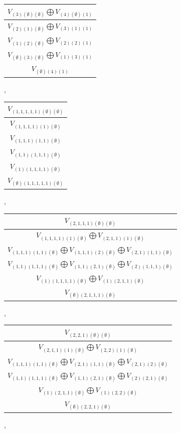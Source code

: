 \documentclass[letterpaper,11pt]{article}
\begin{document}
	\begin{tabular}{| c |}
		\hline
		$V_{(3)(\emptyset)(\emptyset)}$$\bigoplus$$V_{(4)(\emptyset)(1)}$\\
		\hline
		$V_{(2)(1)(\emptyset)}$$\bigoplus$$V_{(3)(1)(1)}$\\
		\hline
		$V_{(1)(2)(\emptyset)}$$\bigoplus$$V_{(2)(2)(1)}$\\
		\hline
		$V_{(\emptyset)(3)(\emptyset)}$$\bigoplus$$V_{(1)(3)(1)}$\\
		\hline
		$V_{(\emptyset)(4)(1)}$\\
		\hline
	\end{tabular}, 
	\begin{tabular}{| c |}
		\hline
		$V_{(1,1,1,1,1)(\emptyset)(\emptyset)}$\\
		\hline
		$V_{(1,1,1,1)(1)(\emptyset)}$\\
		\hline
		$V_{(1,1,1)(1,1)(\emptyset)}$\\
		\hline
		$V_{(1,1)(1,1,1)(\emptyset)}$\\
		\hline
		$V_{(1)(1,1,1,1)(\emptyset)}$\\
		\hline
		$V_{(\emptyset)(1,1,1,1,1)(\emptyset)}$\\
		\hline
	\end{tabular}, 
	\newline 
	\begin{tabular}{| c |}
		\hline
		$V_{(2,1,1,1)(\emptyset)(\emptyset)}$\\
		\hline
		$V_{(1,1,1,1)(1)(\emptyset)}$$\bigoplus$$V_{(2,1,1)(1)(\emptyset)}$\\
		\hline
		$V_{(1,1,1)(1,1)(\emptyset)}$$\bigoplus$$V_{(1,1,1)(2)(\emptyset)}$$\bigoplus$$V_{(2,1)(1,1)(\emptyset)}$\\
		\hline
		$V_{(1,1)(1,1,1)(\emptyset)}$$\bigoplus$$V_{(1,1)(2,1)(\emptyset)}$$\bigoplus$$V_{(2)(1,1,1)(\emptyset)}$\\
		\hline
		$V_{(1)(1,1,1,1)(\emptyset)}$$\bigoplus$$V_{(1)(2,1,1)(\emptyset)}$\\
		\hline
		$V_{(\emptyset)(2,1,1,1)(\emptyset)}$\\
		\hline
	\end{tabular}, 
	\begin{tabular}{| c |}
		\hline
		$V_{(2,2,1)(\emptyset)(\emptyset)}$\\
		\hline
		$V_{(2,1,1)(1)(\emptyset)}$$\bigoplus$$V_{(2,2)(1)(\emptyset)}$\\
		\hline
		$V_{(1,1,1)(1,1)(\emptyset)}$$\bigoplus$$V_{(2,1)(1,1)(\emptyset)}$$\bigoplus$$V_{(2,1)(2)(\emptyset)}$\\
		\hline
		$V_{(1,1)(1,1,1)(\emptyset)}$$\bigoplus$$V_{(1,1)(2,1)(\emptyset)}$$\bigoplus$$V_{(2)(2,1)(\emptyset)}$\\
		\hline
		$V_{(1)(2,1,1)(\emptyset)}$$\bigoplus$$V_{(1)(2,2)(\emptyset)}$\\
		\hline
		$V_{(\emptyset)(2,2,1)(\emptyset)}$\\
		\hline
	\end{tabular}, 
\end{document}
